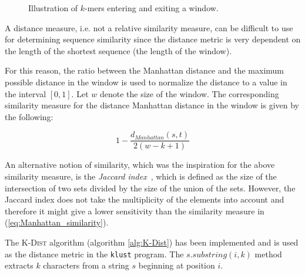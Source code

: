 \begin{figure}[H]
\centering
{}
\caption{Illustration of $k$-mers entering and exiting a window.}
\label{fig:d2_forward_differences}
\end{figure}

A distance measure, i.e. not a relative similarity measure, can be difficult to
use for determining sequence similarity since the distance metric is very
dependent on the length of the shortest sequence (the length of the window).

For this reason, the ratio between the Manhattan distance and the maximum
possible distance in the window is used to normalize the distance to a value in
the interval $[0,1]$. Let $w$ denote the size of the window. The corresponding
similarity measure for the distance Manhattan distance in the window is given
by the following:

\begin{equation}
  1 - \frac{d_{Manhattan}(s,t)}{2(w - k + 1)} \label{eq:Manhattan_similarity}
\end{equation}

An alternative notion of similarity, which was the inspiration for the above
similarity measure, is the \emph{Jaccard index}~\cite{jaccard1912}, which is
defined as the size of the intersection of two sets divided by the size of the
union of the sets.  However, the Jaccard index does not take the multiplicity
of the elements into account and therefore it might give a lower sensitivity
than the similarity measure in (\ref{eq:Manhattan_similarity}).

The \textsc{K-Dist} algorithm (algorithm \ref{alg:K-Dist}) has been implemented
and is used as the distance metric in the \texttt{klust} program. The
$s.substring(i,k)$ method extracts $k$ characters from a string $s$ beginning
at position $i$.

